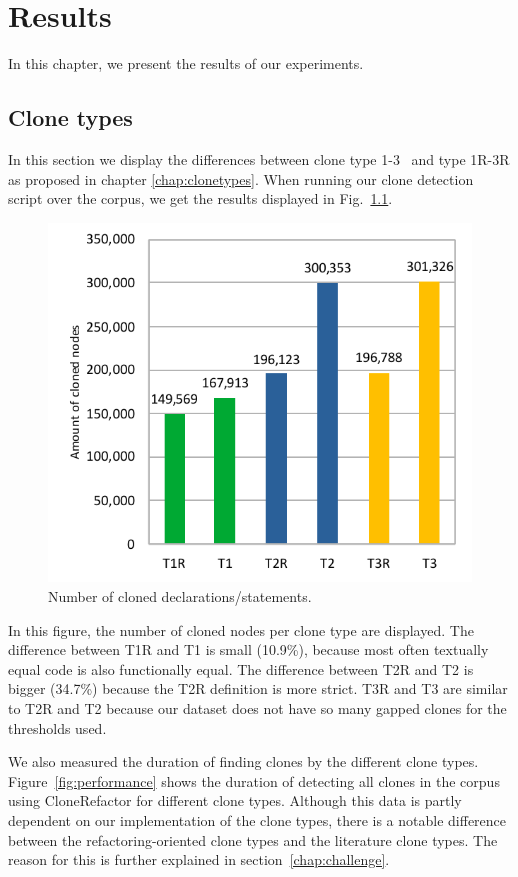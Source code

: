 \chapter{Results}\label{ch:results}
In this chapter, we present the results of our experiments.

\section{Clone types}\label{sec:clonetypeexperiments}
In this section we display the differences between clone type 1-3~\cite{roy2007survey} and type 1R-3R as proposed in chapter \ref{chap:clonetypes}. When running our clone detection script over the corpus, we get the results displayed in Fig.~\ref{fig:typeres}.

\begin{figure}[H]
  \centering
    \includegraphics[width=.5\columnwidth]{img/TypeResults}
      \caption{Number of cloned declarations/statements.}
  \label{fig:typeres}
\end{figure}

In this figure, the number of cloned nodes per clone type are displayed. The difference between T1R and T1 is small (10.9\%), because most often textually equal code is also functionally equal. The difference between T2R and T2 is bigger (34.7\%) because the T2R definition is more strict. T3R and T3 are similar to T2R and T2 because our dataset does not have so many gapped clones for the thresholds used.

We also measured the duration of finding clones by the different clone types. Figure~\ref{fig:performance} shows the duration of detecting all clones in the corpus using CloneRefactor for different clone types. Although this data is partly dependent on our implementation of the clone types, there is a notable difference between the refactoring-oriented clone types and the literature clone types. The reason for this is further explained in section~\ref{chap:challenge}.

